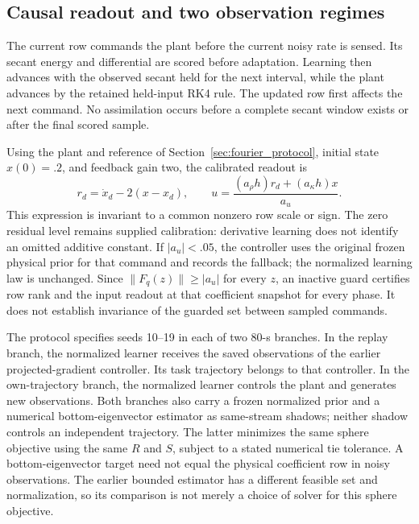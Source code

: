 \subsection{Causal readout and two observation regimes}
The current row commands the plant before the current noisy rate is sensed.
Its secant energy and differential are scored before adaptation. Learning
then advances with the observed secant held for the next interval, while
the plant advances by the retained held-input RK4 rule. The updated row
first affects the next command. No assimilation occurs before a complete
secant window exists or after the final scored sample.

Using the plant and reference of Section~\ref{sec:fourier_protocol}, initial
state $x(0)=.2$, and feedback gain two, the calibrated readout is
\begin{equation}
 r_d=\dot x_d-2(x-x_d),\qquad
 u=\frac{(a_\rho h)r_d+(a_\kappa h)x}{a_u}.
 \label{eq:nf_control}
\end{equation}
This expression is invariant to a common nonzero row scale or sign.
The zero residual level remains supplied calibration: derivative learning
does not identify an omitted additive constant. If $|a_u|<.05$, the
controller uses the original frozen physical prior for that command and
records the fallback; the normalized learning law is unchanged. Since
$\|F_q(z)\|\ge |a_u|$ for every $z$, an inactive guard certifies row rank
and the input readout at that coefficient snapshot for every phase.
It does not establish invariance of the guarded set between sampled commands.

The protocol specifies seeds 10--19 in each of two 80-s branches. In the
replay branch, the normalized learner receives the saved observations of
the earlier projected-gradient controller. Its task trajectory belongs to
that controller. In the own-trajectory branch, the normalized learner
controls the plant and generates new observations. Both branches also
carry a frozen normalized prior and a numerical bottom-eigenvector
estimator as same-stream shadows; neither shadow controls an independent
trajectory. The latter minimizes the same sphere objective using the same
$R$ and $S$, subject to a stated numerical tie tolerance. A bottom-eigenvector
target need not equal the physical coefficient row in noisy observations.
The earlier bounded estimator has a different feasible set and normalization,
so its comparison is not merely a choice of solver for this sphere objective.

